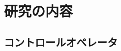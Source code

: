 \documentclass[dvipdfmx,cjk,xcolor=dvipsnames,envcountsect,notheorems,12pt,handout]{beamer} \usepackage{pgfpages} \pgfpagesuselayout{4 on 1}[a4paper,landscape,border shrink=5mm]
\theoremstyle{definition}
\begin{document}

\section{研究の内容}






\subsection{コントロールオペレータ}
\end{document}
